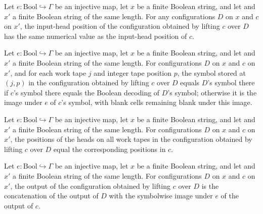 \begin{theorem}
\label{Turing.Cfg.liftOver_inputPos}
\leanok
{}
Let $e:\mathrm{Bool}\hookrightarrow\Gamma$ be an injective map, let $x$ be a finite Boolean string, and let
and $x'$ a finite Boolean string of the same length. For any configurations $D$ on $x$
and $c$ on $x'$, the input-head position of the configuration obtained by lifting $c$
over $D$ has the same numerical value as the input-head position of $c$.
\end{theorem}

\begin{theorem}
\label{Turing.Cfg.liftOver_workTapes}
\leanok
{}
Let $e:\mathrm{Bool}\hookrightarrow\Gamma$ be an injective map, let $x$ be a finite Boolean string, and let
and $x'$ a finite Boolean string of the same length. For configurations $D$ on $x$ and
$c$ on $x'$, and for each work tape $j$ and integer tape position $p$, the symbol stored
at $(j,p)$ in the configuration obtained by lifting $c$ over $D$ equals $D$'s symbol
there if $c$'s symbol there equals the Boolean decoding of $D$'s symbol; otherwise it is
the image under $e$ of $c$'s symbol, with blank cells remaining blank under this image.
\end{theorem}

\begin{theorem}
\label{Turing.Cfg.liftOver_workTapePos}
\leanok
{}
Let $e:\mathrm{Bool}\hookrightarrow\Gamma$ be an injective map, let $x$ be a finite Boolean string, and let
and $x'$ a finite Boolean string of the same length. For configurations $D$ on $x$ and
$c$ on $x'$, the positions of the heads on all work tapes in the configuration obtained
by lifting $c$ over $D$ equal the corresponding positions in $c$.
\end{theorem}

\begin{theorem}
\label{Turing.Cfg.liftOver_output}
\leanok
{}
Let $e:\mathrm{Bool}\hookrightarrow\Gamma$ be an injective map, let $x$ be a finite Boolean string, and let
and $x'$ a finite Boolean string of the same length. For configurations $D$ on $x$ and
$c$ on $x'$, the output of the configuration obtained by lifting $c$ over $D$ is the
concatenation of the output of $D$ with the symbolwise image under $e$ of the output of
$c$.
\end{theorem}
